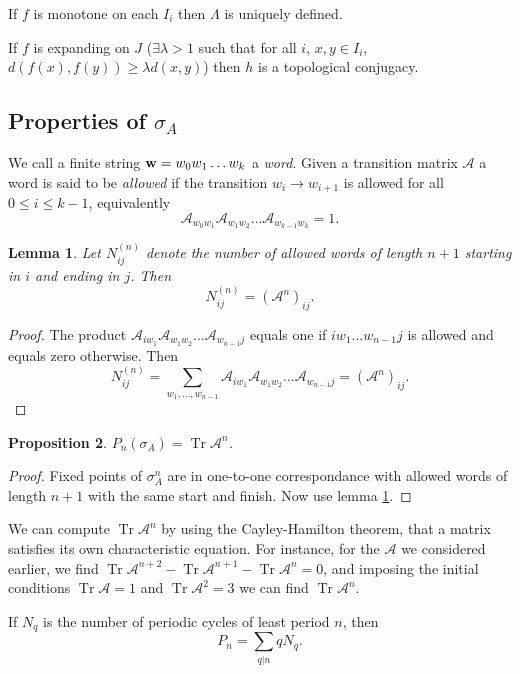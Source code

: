 \documentclass{notes}
\newcommand{\cA}{\mathcal{A}}
\DeclareMathOperator{\Tr}{Tr}
\theoremstyle{plain}
\newtheorem{proposition}{Proposition}[chapter]
\newtheorem{lemma}[proposition]{Lemma}
\begin{document}
If $f$ is monotone on each $I_i$ then $\Lambda$ is uniquely defined.

If $f$ is expanding on $J$ ($\exists \lambda > 1$ such that
for all $i$, $x,y \in I_i$, $d(f(x),f(y)) \ge \lambda d(x,y)$)
then $h$ is a topological conjugacy.

\subsection{Properties of $\sigma_A$}

We call a finite string $\mathbf{w} = w_0 w_1 \dots w_k$ a \emph{word}.
Given a transition matrix $\cA$ a word is said to be \emph{allowed} if
the transition $w_i \to w_{i+1}$ is allowed for all $0 \le i \le k-1$,
equivalently
\[
\cA_{w_0 w_1} \cA_{w_1 w_2} \dots \cA_{w_{k-1} w_k} = 1.
\]

\begin{lemma}\label{lem:wordcount}
  Let $N_{ij}^{(n)}$ denote the number of allowed words of length
  $n+1$ starting in $i$ and ending in $j$.  Then
\[
N_{ij}^{(n)} = \left( \cA^n \right)_{ij}.
\]
\end{lemma}

\begin{proof}
The product $\cA_{i w_1} \cA_{w_1 w_2} \dots \cA_{w_{n-1} j}$ equals one
if $i w_1 \dots w_{n-1} j$ is allowed and equals zero otherwise.  Then
\[
N_{ij}^{(n)} = \sum_{w_1,\dots,w_{n-1}}
\cA_{i w_1} \cA_{w_1 w_2} \dots \cA_{w_{n-1} j} = \left( \cA^n \right)_{ij}.
\]
\end{proof}

\begin{proposition}
$P_n(\sigma_A) = \Tr \cA^n$.
\end{proposition}

\begin{proof}
Fixed points of $\sigma_A^n$ are in one-to-one correspondance with
allowed words of length $n+1$ with the same start and finish.  Now
use lemma \ref{lem:wordcount}.
\end{proof}

We can compute $\Tr \cA^n$ by using the Cayley-Hamilton theorem, that
a matrix satisfies its own characteristic equation.  For instance, for
the $\cA$ we considered earlier, we find
$\Tr \cA^{n+2} - \Tr \cA^{n+1} - \Tr \cA^n = 0$, and imposing the
initial conditions $\Tr \cA = 1$ and $\Tr \cA^2 = 3$ we can find $\Tr \cA^n$.

If $N_q$ is the number of periodic cycles of least period $n$, then
\[
P_n = \sum_{q | n} q N_q.
\]
\end{document}
